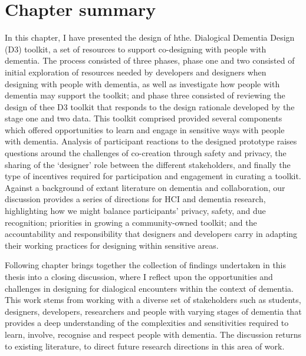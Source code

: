 \section{Chapter summary}
\label{D3:Summary}
In this chapter, I have presented the design of hthe. Dialogical Dementia Design (D3) toolkit, a set of resources to support co-designing with people with dementia. The process consisted of three phases, phase one and two consisted of initial exploration of resources needed by developers and designers when designing with people with dementia, as well as investigate how people with dementia may support the toolkit; and phase three consisted of reviewing the design of thee D3 toolkit that responds to the design rationale developed by the stage one and two data. This toolkit comprised provided several components which offered opportunities to learn and engage in sensitive ways with people with dementia. Analysis of participant reactions to the designed prototype raises questions around the challenges of co-creation through safety and privacy, the sharing of the ‘designer’ role between the different stakeholders, and finally the type of incentives required for participation and engagement in curating a toolkit. Against a background of extant literature on dementia and collaboration, our discussion provides a series of directions for HCI and dementia research, highlighting how we might balance participants' privacy, safety, and due recognition; priorities in growing a community-owned toolkit; and the accountability and responsibility that designers and developers carry in adapting their working practices for designing within sensitive areas.

Following chapter brings together the collection of findings undertaken in this thesis into a closing discussion, where I reflect upon the opportunities and challenges in designing for dialogical encounters within the context of dementia. This work stems from working with a diverse set of stakeholders such as students, designers, developers, researchers and people with varying stages of dementia that provides a deep understanding of the complexities and sensitivities required to learn, involve, recognise and respect people with dementia. The discussion returns to existing literature, to direct future research directions in this area of work. 